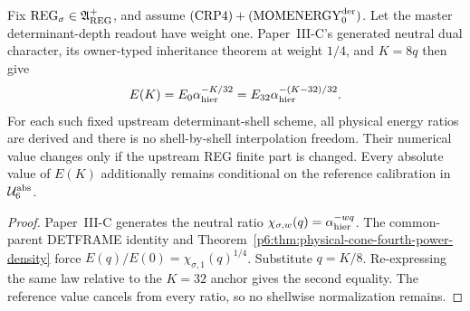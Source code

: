 \documentclass[12pt,a4paper]{article}
\newcommand{\Uabs}{\mathcal U_6^{\rm abs}}
\begin{document}
\begin{theorem}
\label{p6:thm:derived-dimension-weighted-shell-law}
Fix \(\mathrm{REG}_{\sigma}\in\mathfrak A_{\rm REG}^{+}\), and assume
\((\mathrm{CRP4})+(\mathrm{MOMENERGY}_{0}^{\rm der})\).  Let the master
determinant-depth readout have weight one.  Paper~III-C's generated neutral
dual character, its owner-typed inheritance theorem at weight \(1/4\), and
\(K=8q\) then give
\begin{equation}
\label{p6:eq:continuous-shell-law}
E(K)
=
E_0\alpha_{\rm hier}^{-K/32}
=E_{32}\alpha_{\rm hier}^{-(K-32)/32}.
\end{equation}
For each such fixed upstream determinant-shell scheme, all physical energy
ratios are derived and
there is no shell-by-shell interpolation freedom.  Their numerical value
changes only if the upstream REG finite part is changed.  Every absolute value
of \(E(K)\) additionally remains conditional on the reference calibration in
\(\Uabs\).
\end{theorem}

\begin{proof}
Paper~III-C generates the neutral ratio
\(\chi_{\sigma,w}(q)=\alpha_{\rm hier}^{-wq}\).
The common-parent DETFRAME identity and
Theorem~\ref{p6:thm:physical-cone-fourth-power-density} force
\(E(q)/E(0)=\chi_{\sigma,1}(q)^{1/4}\).  Substitute \(q=K/8\).
Re-expressing the same law relative to the \(K=32\) anchor gives the second
equality.  The reference value cancels from every ratio, so no shellwise
normalization remains.
\end{proof}
\end{document}
